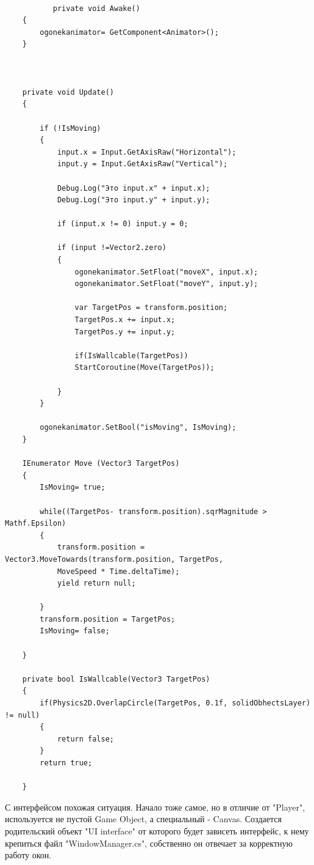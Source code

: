 \documentclass[bachelor, och, coursework, times]{SCWorks}
\begin{document}
    \begin{verbatim}

           private void Awake()
    {
        ogonekanimator= GetComponent<Animator>();
    }



    private void Update()
    {

        if (!IsMoving)
        {
            input.x = Input.GetAxisRaw("Horizontal");
            input.y = Input.GetAxisRaw("Vertical");

            Debug.Log("Это input.x" + input.x);
            Debug.Log("Это input.y" + input.y);

            if (input.x != 0) input.y = 0; 

            if (input !=Vector2.zero) 
            {
                ogonekanimator.SetFloat("moveX", input.x);
                ogonekanimator.SetFloat("moveY", input.y);
              
                var TargetPos = transform.position;
                TargetPos.x += input.x;
                TargetPos.y += input.y;

                if(IsWallcable(TargetPos)) 
                StartCoroutine(Move(TargetPos));

            }
        }

        ogonekanimator.SetBool("isMoving", IsMoving);
    }

    IEnumerator Move (Vector3 TargetPos)
    {
        IsMoving= true;

        while((TargetPos- transform.position).sqrMagnitude > Mathf.Epsilon) 
        {
            transform.position = Vector3.MoveTowards(transform.position, TargetPos, 
            MoveSpeed * Time.deltaTime);
            yield return null;
        
        }
        transform.position = TargetPos;
        IsMoving= false;

    }

    private bool IsWallcable(Vector3 TargetPos)
    {
        if(Physics2D.OverlapCircle(TargetPos, 0.1f, solidObhectsLayer) != null)
        {
            return false;
        }
        return true;

    }

    \end{verbatim}

    С интерфейсом похожая ситуация. Начало тоже самое, но в отличие от "Player", используется
    не пустой Game Object, а специальный - Canvas. Создается родительский объект 
    "UI interface" от которого будет зависеть интерфейс, к нему крепиться файл "WindowManager.cs", 
    собственно  он отвечает за корректную работу окон.
\end{document}
